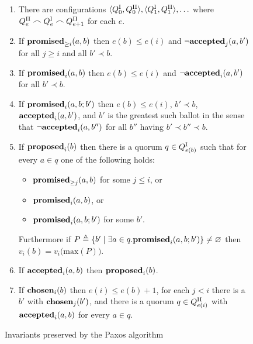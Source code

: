 \documentclass[journal]{IEEEtran}
\begin{document}
\begin{figure*} \caption{Invariants preserved by the Paxos
  algorithm\label{paxos-invariants-figure}}

\renewcommand{\theenumi}{P\arabic{enumi}}

\begin{enumerate}

\item\label{paxos-quorums} There are configurations $\langle {Q}^\textrm{I}_{0}, {Q}^\textrm{II}_{0}
  \rangle, \langle {Q}^\textrm{I}_{1}, {Q}^\textrm{II}_{1} \rangle, \ldots$ where ${{Q}^\textrm{II}_{e} \frown
  {Q}^\textrm{I}_{e} \frown {Q}^\textrm{II}_{e+1}}$ for each $e$.

\item\label{paxos-mprom} If $\mathbf{promised}_{\ge i}(a,b)$ then $e(b) \le e(i)$ and
  $\neg\mathbf{accepted}_{j}(a,b')$ for all $j \ge i$ and all $b' \prec b$.

\item\label{paxos-fprom} If $\mathbf{promised}_{i}(a,b)$ then $e(b) \le e(i)$ and
  $\neg\mathbf{accepted}_{i}(a,b')$ for all $b' \prec b$.

\item\label{paxos-bprom} If $\mathbf{promised}_{i}(a,b;b')$ then $e(b) \le e(i)$, $b'
  \prec b$, $\mathbf{accepted}_{i}(a,b')$, and $b'$ is the greatest such ballot in the sense
  that $\neg \mathbf{accepted}_{i}(a,b'')$ for all $b''$ having $b' \prec b'' \prec b$.

\item\label{paxos-prop} If $\mathbf{proposed}_{i}(b)$ then there is a quorum $q \in
  {Q}^\textrm{I}_{e(b)}$ such that for every $a \in q$ one of the following holds:
%
\begin{itemize}
\item $\mathbf{promised}_{\ge j}(a,b)$ for some $j \le i$, or
\item $\mathbf{promised}_{i}(a,b)$, or
\item $\mathbf{promised}_{i}(a,b;b')$ for some $b'$.
\end{itemize}
%
Furthermore if $P \triangleq \{ b' \mid \exists a \in q. \mathbf{promised}_{i}(a,b;b') \}
\ne \varnothing$ then $v_i(b) = v_i\bigl(\mathrm{max}(P)\bigr)$.

\item \label{paxos-acc} If $\mathbf{accepted}_{i}(a,b)$ then $\mathbf{proposed}_{i}(b)$.

\item \label{paxos-chosen} If $\mathbf{chosen}_{i}(b)$ then $e(i) \le e(b) + 1$, for
  each $j < i$ there is a $b'$ with $\mathbf{chosen}_{j}(b')$, and there is a quorum
  $q \in {Q}^\textrm{II}_{e(i)}$ with $\mathbf{accepted}_{i}(a,b)$ for every $a \in q$.

\end{enumerate}

\end{figure*}
\end{document}
